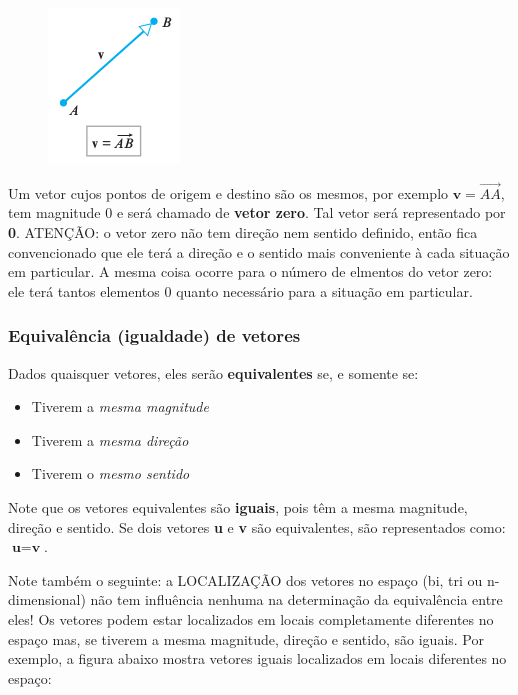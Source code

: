 \documentclass[pdftex, brazil, 12pt, twoside]{article}
\newcommand{\vet}[1]{\textbf{#1}}
\newcommand{\seta}[1]{\overrightarrow{#1}}
\begin{document}
\begin{figure}[H]
  \begin{center}
    \includegraphics[scale=0.6]{imagens/vet002.png}
  \end{center}
\end{figure}

Um vetor cujos pontos de origem e destino são os mesmos, por exemplo
$\vet{v} = \seta{AA}$, tem magnitude 0 e será chamado de \textbf{vetor zero}.
Tal vetor será representado por \vet{0}. ATENÇÃO: o vetor zero não tem direção
nem sentido definido, então fica convencionado que ele terá a direção e o sentido
mais conveniente à cada situação em particular. A mesma coisa ocorre para o número
de elmentos do vetor zero: ele terá tantos elementos $0$ quanto necessário para
a situação em particular.

\subsubsection{Equivalência (igualdade) de vetores}
\label{evd-geom-bi-tri-n-dimen-equiv}

Dados quaisquer vetores, eles serão \textbf{equivalentes} se, e somente se:
\begin{itemize}[noitemsep]
\item Tiverem a \emph{mesma magnitude}
\item Tiverem a \emph{mesma direção}
\item Tiverem o \emph{mesmo sentido}
\end{itemize}

Note que os vetores equivalentes são \textbf{iguais}, pois têm a mesma magnitude,
direção e sentido. Se dois vetores \vet{u} e \vet{v} são equivalentes, são
representados como: $\vet{u} = \vet{v}$.

Note também o seguinte: a LOCALIZAÇÃO dos vetores no espaço (bi, tri ou n-dimensional)
não tem influência
nenhuma na determinação da equivalência entre eles! Os vetores podem estar localizados
em locais completamente diferentes no espaço mas, se tiverem a mesma magnitude,
direção e sentido, são iguais. Por exemplo, a figura abaixo mostra vetores iguais
localizados em locais diferentes no espaço:
\end{document}
